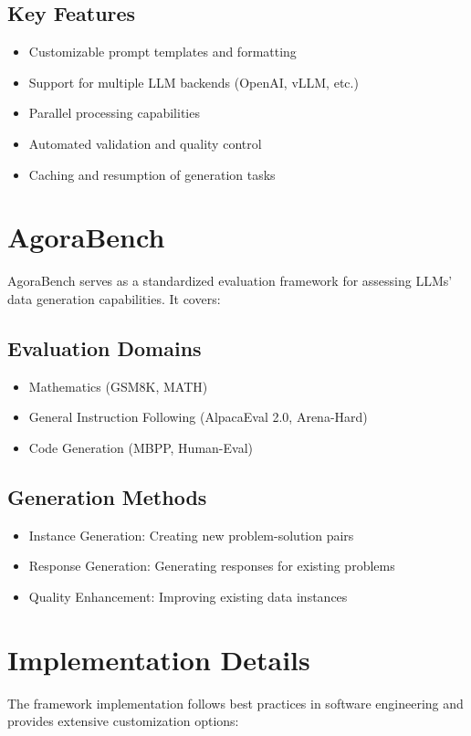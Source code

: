 \documentclass[10pt,conference]{IEEEtran}
\begin{document}
\subsection{Key Features}
\begin{itemize}
    \item Customizable prompt templates and formatting
    \item Support for multiple LLM backends (OpenAI, vLLM, etc.)
    \item Parallel processing capabilities
    \item Automated validation and quality control
    \item Caching and resumption of generation tasks
\end{itemize}

\section{AgoraBench}
AgoraBench serves as a standardized evaluation framework for assessing LLMs' data generation capabilities. It covers:

\subsection{Evaluation Domains}
\begin{itemize}
    \item Mathematics (GSM8K, MATH)
    \item General Instruction Following (AlpacaEval 2.0, Arena-Hard)
    \item Code Generation (MBPP, Human-Eval)
\end{itemize}

\subsection{Generation Methods}
\begin{itemize}
    \item Instance Generation: Creating new problem-solution pairs
    \item Response Generation: Generating responses for existing problems
    \item Quality Enhancement: Improving existing data instances
\end{itemize}

\section{Implementation Details}
The framework implementation follows best practices in software engineering and provides extensive customization options:
\end{document}
